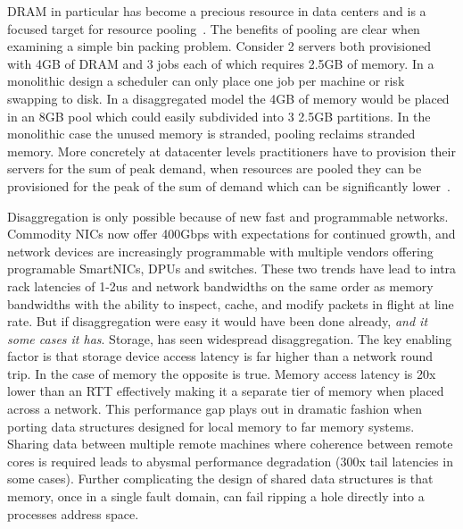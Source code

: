 \documentclass[12pt]{ucsddissertation}
\begin{document}
\begin{dissertationintroduction}
DRAM in particular has become a precious resource in data centers and is a focused target for
resource pooling~\cite{micron-memorywall}. The benefits of pooling are clear when examining a
simple bin packing problem. Consider 2 servers both provisioned with 4GB of DRAM and 3 jobs each of
which requires 2.5GB of memory. In a monolithic design a scheduler can only place one job per
machine or risk swapping to disk. In a disaggregated model the 4GB of memory would be placed in an
8GB pool which could easily subdivided into 3 2.5GB partitions. In the monolithic case the unused
memory is stranded, pooling reclaims stranded memory.  More concretely at datacenter levels
practitioners have to provision their servers for the sum of peak demand, when resources are pooled
they can be provisioned for the peak of the sum of demand which can be significantly
lower~\cite{supernic, dsnf}.

Disaggregation is only possible because of new fast and programmable networks. Commodity NICs now
offer 400Gbps with expectations for continued growth, and network devices are increasingly
programmable with multiple vendors offering programable SmartNICs, DPUs and switches.  These two
trends have lead to intra rack latencies of 1-2us and network bandwidths on the same order as memory
bandwidths with the ability to inspect, cache, and modify packets in flight at line rate.
But if disaggregation were easy it would have been done already, \textit{and it some cases it has}.
Storage, has seen widespread disaggregation. The key enabling factor is that storage device access
latency is far higher than a network round trip. In the case of memory the opposite is true. Memory
access latency is 20x lower than an RTT effectively making it a separate tier of memory when placed
across a network.  This performance gap plays out in dramatic fashion when porting data structures
designed for local memory to far memory systems. Sharing data between multiple remote machines where
coherence between remote cores is required leads to abysmal performance degradation (300x tail
latencies in some cases). Further complicating the design of shared data structures is that memory,
once in a single fault domain, can fail ripping a hole directly into a processes address space.


\end{dissertationintroduction}
\end{document}
